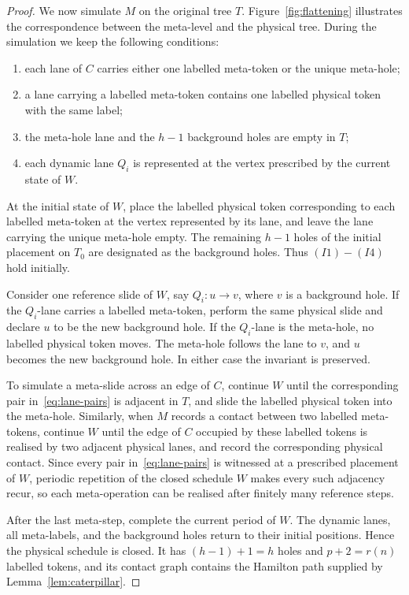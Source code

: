 \documentclass[11pt]{article}
\theoremstyle{remark}
\numberwithin{equation}{section}
\begin{document}
\begin{proof}
We now simulate $M$ on the original tree $T$. Figure~\ref{fig:flattening} illustrates the correspondence between the meta-level and the physical tree. During the simulation we keep the following conditions:
\begin{enumerate}[label=(I\arabic*),leftmargin=3.5em]
\item each lane of $C$ carries either one labelled meta-token or the unique meta-hole;
\item a lane carrying a labelled meta-token contains one labelled physical token with the same label;
\item the meta-hole lane and the $h-1$ background holes are empty in $T$;
\item each dynamic lane $Q_i$ is represented at the vertex prescribed by the current state of $W$.
\end{enumerate}

At the initial state of $W$, place the labelled physical token corresponding to each labelled meta-token at the vertex represented by its lane, and leave the lane carrying the unique meta-hole empty. The remaining $h-1$ holes of the initial placement on $T_0$ are designated as the background holes. Thus $(I1)-(I4)$ hold initially.

Consider one reference slide of $W$, say $Q_i:u\to v$, where $v$ is a background hole. If the $Q_i$-lane carries a labelled meta-token, perform the same physical slide and declare $u$ to be the new background hole. If the $Q_i$-lane is the meta-hole, no labelled physical token moves. The meta-hole follows the lane to $v$, and $u$ becomes the new background hole. In either case the invariant is preserved.

To simulate a meta-slide across an edge of $C$, continue $W$ until the corresponding pair in~\eqref{eq:lane-pairs} is adjacent in $T$, and slide the labelled physical token into the meta-hole. Similarly, when $M$ records a contact between two labelled meta-tokens, continue $W$ until the edge of $C$ occupied by these labelled tokens is realised by two adjacent physical lanes, and record the corresponding physical contact. Since every pair in~\eqref{eq:lane-pairs} is witnessed at a prescribed placement of $W$, periodic repetition of the closed schedule $W$ makes every such adjacency recur, so each meta-operation can be realised after finitely many reference steps.

After the last meta-step, complete the current period of $W$. The dynamic lanes, all meta-labels, and the background holes return to their initial positions. Hence the physical schedule is closed. It has $(h-1)+1=h$ holes and $p+2=r(n)$ labelled tokens, and its contact graph contains the Hamilton path supplied by Lemma~\ref{lem:caterpillar}.
\end{proof}
\end{document}
